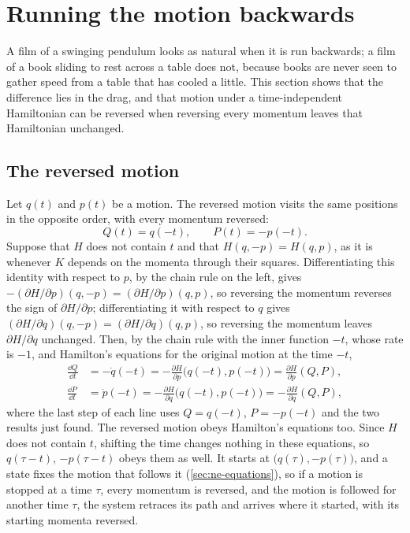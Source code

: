 \section{Running the motion backwards}
\label{sec:ha-reversal}

A film of a swinging pendulum looks as natural when it is run
backwards; a film of a book sliding to rest across a table does not,
because books are never seen to gather speed from a table that has cooled
a little. This section shows that the difference lies in the drag, and
that motion under a time-independent Hamiltonian can be reversed when
reversing every momentum leaves that Hamiltonian unchanged.

\subsection*{The reversed motion}

Let $q(t)$ and $p(t)$ be a motion. The reversed motion visits the same
positions in the opposite order, with every momentum reversed:
\begin{equation*}
   Q(t) = q(-t) , \qquad P(t) = -p(-t) .
\end{equation*}
Suppose that $H$ does not contain $t$ and that $H(q, -p) = H(q, p)$, as
it is whenever $K$ depends on the momenta through their squares. Differentiating this identity with respect
to $p$, by the chain rule on the left, gives $-(\partial H/\partial p)(q,
-p) = (\partial H/\partial p)(q, p)$, so reversing the momentum reverses
the sign of $\partial H/\partial p$; differentiating it with respect to
$q$ gives $(\partial H/\partial q)(q, -p) = (\partial H/\partial q)(q,
p)$, so reversing the momentum leaves $\partial H/\partial q$ unchanged.
Then, by the chain rule with the inner function $-t$, whose rate is $-1$,
and Hamilton's equations for the original motion at the time $-t$,
\begin{align*}
   \frac{\dd Q}{\dd t} &= -\dot{q}(-t)
   = -\frac{\partial H}{\partial p}\bigl(q(-t), p(-t)\bigr)
   = \frac{\partial H}{\partial p}(Q, P) ,\\
   \frac{\dd P}{\dd t} &= \dot{p}(-t)
   = -\frac{\partial H}{\partial q}\bigl(q(-t), p(-t)\bigr)
   = -\frac{\partial H}{\partial q}(Q, P) ,
\end{align*}
where the last step of each line uses $Q = q(-t)$, $P = -p(-t)$ and the two
results just found. The reversed motion obeys Hamilton's equations too.
Since $H$ does not contain $t$, shifting the time changes nothing in these
equations, so $q(\tau - t)$, $-p(\tau - t)$ obeys them as well. It starts
at $\bigl(q(\tau), -p(\tau)\bigr)$, and a state fixes the motion that
follows it (\cref{sec:ne-equations}), so if a motion is stopped at a time
$\tau$, every momentum is reversed, and the motion is followed for another time $\tau$, the system retraces
its path and arrives where it started, with its starting momenta
reversed.

